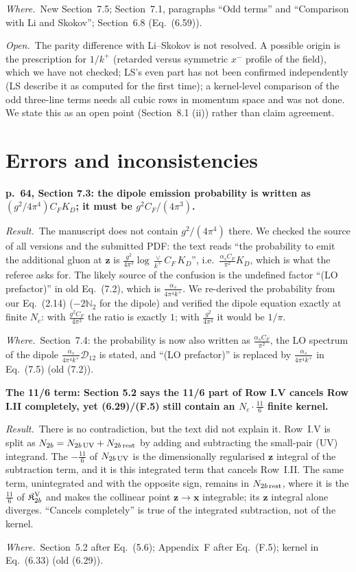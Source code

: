 \documentclass[a4paper,11pt]{article}
\def\v#1{\mathbf{#1}}
\def\mf#1{\mathbb{#1}}
\newcommand{\point}[1]{\par\medskip\noindent\textbf{#1}\par}
\newcommand{\result}{\par\noindent\emph{Result.}\ }
\newcommand{\where}{\par\noindent\emph{Where.}\ }
\newcommand{\open}{\par\noindent\emph{Open.}\ }
\begin{document}
\where New Section~7.5; Section~7.1, paragraphs ``Odd terms'' and ``Comparison with Li and Skokov''; Section~6.8 (Eq.~(6.59)).
\open The parity difference with Li--Skokov is not resolved. A possible origin is the prescription for $1/k^+$ (retarded versus symmetric $x^-$ profile of the field), which we have not checked; LS's even part has not been confirmed independently (LS describe it as computed for the first time); a kernel-level comparison of the odd three-line terms needs all cubic rows in momentum space and was not done. We state this as an open point (Section~8.1 (ii)) rather than claim agreement.

\section*{Errors and inconsistencies}

\point{p.~64, Section 7.3: the dipole emission probability is written as $(g^2/4\pi^4)C_FK_D$; it must be $g^2C_F/(4\pi^3)$.}
\result The manuscript does not contain $g^2/(4\pi^4)$ there. We checked the source of all versions and the submitted PDF: the text reads ``the probability to emit the additional gluon at $\v z$ is $\frac{g^2}{4\pi^3}\log\frac{\vee}{k^+}C_F\,K_D$'', i.e.\ $\frac{\alpha_sC_F}{\pi^2}K_D$, which is what the referee asks for. The likely source of the confusion is the undefined factor ``(LO prefactor)'' in old Eq.~(7.2), which is $\frac{\alpha_s}{4\pi^4k^+}$. We re-derived the probability from our Eq.~(2.14) ($-2\mf N_2$ for the dipole) and verified the dipole equation exactly at finite $N_c$: with $\frac{g^2C_F}{4\pi^3}$ the ratio is exactly $1$; with $\frac{g^2}{4\pi^4}$ it would be $1/\pi$.
\where Section~7.4: the probability is now also written as $\frac{\alpha_sC_F}{\pi^2}$, the LO spectrum of the dipole $\frac{\alpha_s}{4\pi^4k^+}\mathcal D_{12}$ is stated, and ``(LO prefactor)'' is replaced by $\frac{\alpha_s}{4\pi^4k^+}$ in Eq.~(7.5) (old (7.2)).

\point{The 11/6 term: Section 5.2 says the 11/6 part of Row I.V cancels Row I.II completely, yet (6.29)/(F.5) still contain an $N_c\cdot\frac{11}{6}$ finite kernel.}
\result There is no contradiction, but the text did not explain it. Row~I.V is split as $N_{2b}=N_{2b\,\rm UV}+N_{2b\,\rm rest}$ by adding and subtracting the small-pair (UV) integrand. The $-\frac{11}{6}$ of $N_{2b\,\rm UV}$ is the dimensionally regularised $\v z$ integral of the subtraction term, and it is this integrated term that cancels Row~I.II. The same term, unintegrated and with the opposite sign, remains in $N_{2b\,\rm rest}$, where it is the $\frac{11}{6}$ of $\mathfrak K^{\rm V}_{2b}$ and makes the collinear point $\v z\to\v x$ integrable; its $\v z$ integral alone diverges. ``Cancels completely'' is true of the integrated subtraction, not of the kernel.
\where Section~5.2 after Eq.~(5.6); Appendix~F after Eq.~(F.5); kernel in Eq.~(6.33) (old (6.29)).
\end{document}
